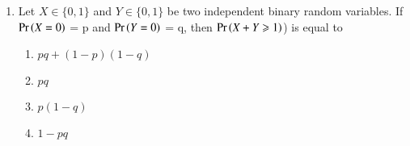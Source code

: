 \renewcommand{\theequation}{\theenumi}
\renewcommand{\thefigure}{\theenumi}
\renewcommand{\thetable}{\theenumi}
\begin{enumerate}[label=\thesection.\arabic*.,ref=\thesection.\theenumi]


\item Let  $X\in \{ 0,1 \}$ and $Y\in \{ 0,1 \}$ be two independent binary random variables. If $\Pr\left(X=0\right)$ = p and  $\Pr\left(Y=0\right)$ = q, then $\Pr\left(X+Y \geqslant 1\right)$) is equal to 
\begin{enumerate}
\item $pq+(1-p)(1-q)$ 
\item  $pq$    
\item $p(1-q)$ 
\item  $1-pq$  
\end{enumerate}
%
\solution
%

%
\end{enumerate}